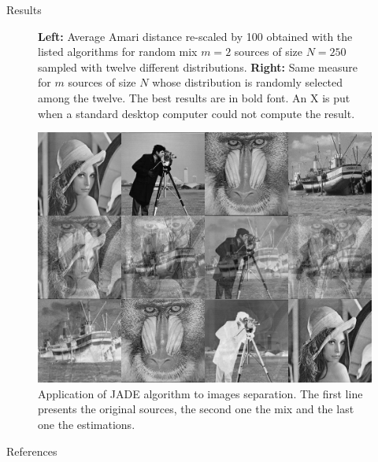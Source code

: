 \documentclass{beamer}
\begin{document}
\begin{frame}{}
\begin{columns}[T]
\begin{column}{.48\linewidth}

%
%


\begin{block}{Results}

\begin{figure}
\label{distres}
\centering
\resizebox{\textwidth}{!}{

}
\caption{\textbf{Left:} Average Amari distance re-scaled by 100 obtained with the listed algorithms for random mix $m=2$ sources of size $N=250$ sampled with twelve different distributions. \textbf{Right:} Same measure for $m$ sources of size $N$ whose distribution is randomly selected among the twelve. The best results are in bold font. An X is put when a standard desktop computer could not compute the result.}
\end{figure}

\begin{figure}
\label{imres}
\centering
\includegraphics[width=16cm]{../../image_test/unmix4.png}
\caption{Application of JADE algorithm to images separation. The first line presents the original sources, the second one the mix and the last one the estimations.}
\end{figure}
\end{block}

\begin{block}{References}

{}
\nocite{*}
\end{block}

\end{column}
\end{columns}

\end{frame}
\end{document}
